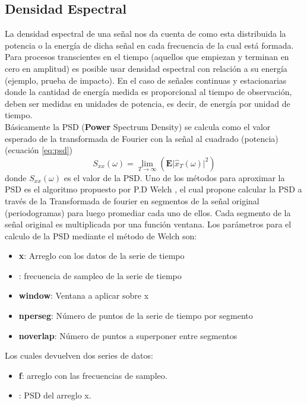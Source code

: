     	\subsection{Densidad Espectral}
	 		La densidad espectral de una señal nos da cuenta de como esta distribuida la potencia o la energía de dicha señal en cada frecuencia de la cual está formada. Para procesos transcientes en el tiempo (aquellos que empiezan y terminan en cero en amplitud) es posible usar densidad espectral con relación a su energía (ejemplo, prueba de impacto). En el caso de señales continuas y estacionarias donde la cantidad de energía medida es proporcional al tiempo de observación, deben ser medidas en unidades de potencia, es decir, de energía por unidad de tiempo.\\
	 		Básicamente la PSD (\textbf{Power} Spectrum Density) se calcula como el valor esperado de la transformada de Fourier con la señal al cuadrado (potencia) (ecuación \ref{eq:psd})
	 		\begin{equation}
		 		S_{xx}(\omega) = \lim_{T\to\infty}(\textbf{E}\lvert \hat{x}_T(\omega)\rvert^2)
		 		\label{eq:psd}
	 		\end{equation}
	 		donde $S_{xx}(\omega)$ es el valor de la PSD.
	 		Uno de los métodos para aproximar la PSD es el algoritmo propuesto por P.D Welch \cite{Welch1967}, el cual propone calcular la PSD a través de la Transformada de fourier en segmentos de la señal original (periodogramas) para luego promediar cada uno de ellos. Cada segmento de la señal original es multiplicada por una función ventana. Los parámetros para el calculo de la PSD mediante el método de Welch son:
	 		\begin{itemize}
	 			\item \textbf{x}: Arreglo con los datos de la serie de tiempo
	 			\item {}: frecuencia de sampleo de la serie de tiempo
	 			\item \textbf{window}: Ventana a aplicar sobre x
	 			\item \textbf{nperseg}: Número de puntos de la serie de tiempo por segmento
	 			\item \textbf{noverlap}: Número de puntos a superponer entre segmentos
 			\end{itemize}
	 		Los cuales devuelven dos series de datos:
	 		\begin{itemize}
	 			\item \textbf{f}: arreglo con las frecuencias de sampleo.
	 			\item {}: PSD del arreglo x.
	 		\end{itemize}
